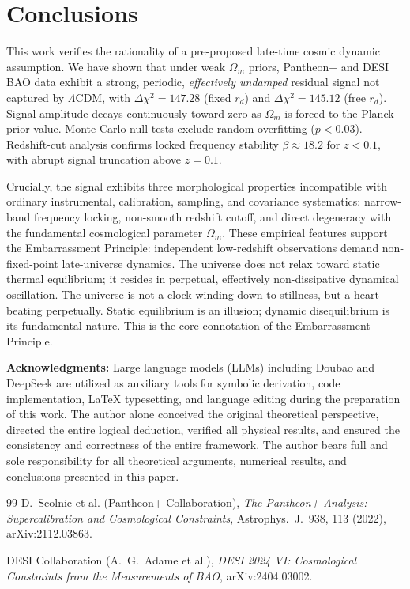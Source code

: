 \documentclass[10pt,a4paper]{article}
\begin{document}
\section{Conclusions}
This work verifies the rationality of a pre-proposed late-time cosmic dynamic assumption. We have shown that under weak $\Omega_m$ priors, Pantheon+ and DESI BAO data exhibit a strong, periodic, \emph{effectively undamped} residual signal not captured by $\Lambda$CDM, with $\Delta\chi^2=147.28$ (fixed $r_d$) and $\Delta\chi^2=145.12$ (free $r_d$). Signal amplitude decays continuously toward zero as $\Omega_m$ is forced to the Planck prior value. Monte Carlo null tests exclude random overfitting ($p<0.03$). Redshift-cut analysis confirms locked frequency stability $\beta\approx18.2$ for $z<0.1$, with abrupt signal truncation above $z=0.1$.

Crucially, the signal exhibits three morphological properties incompatible with ordinary instrumental, calibration, sampling, and covariance systematics: narrow-band frequency locking, non-smooth redshift cutoff, and direct degeneracy with the fundamental cosmological parameter $\Omega_m$. These empirical features support the Embarrassment Principle: independent low-redshift observations demand non-fixed-point late-universe dynamics. The universe does not relax toward static thermal equilibrium; it resides in perpetual, effectively non-dissipative dynamical oscillation.
The universe is not a clock winding down to stillness, but a heart beating perpetually. Static equilibrium is an illusion; dynamic disequilibrium is its fundamental nature. This is the core connotation of the Embarrassment Principle.

\vspace{1em}
\textbf{Acknowledgments:} Large language models (LLMs) including Doubao and DeepSeek are utilized as auxiliary tools for symbolic derivation, code implementation, LaTeX typesetting, and language editing during the preparation of this work. The author alone conceived the original theoretical perspective, directed the entire logical deduction, verified all physical results, and ensured the consistency and correctness of the entire framework. The author bears full and sole responsibility for all theoretical arguments, numerical results, and conclusions presented in this paper.


\begin{thebibliography}{99}
D.~Scolnic et al. (Pantheon+ Collaboration),
\emph{The Pantheon+ Analysis: Supercalibration and Cosmological Constraints},
Astrophys.~J.~938, 113 (2022), arXiv:2112.03863.

DESI Collaboration (A.~G.~Adame et al.),
\emph{DESI 2024 VI: Cosmological Constraints from the Measurements of BAO},
arXiv:2404.03002.
\end{thebibliography}
\end{document}
